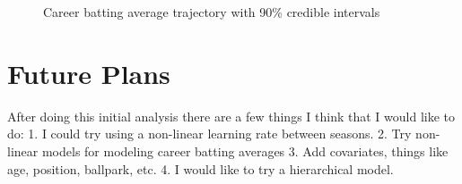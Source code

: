 \documentclass[
  letterpaper,
  DIV=11,
  numbers=noendperiod]{scrartcl}
\begin{document}
\begin{figure}[H]


\caption{\label{fig-career-trajectory}Career batting average trajectory
with 90\% credible intervals}

\end{figure}%

\section{Future Plans}\label{future-plans}

After doing this initial analysis there are a few things I think that I
would like to do: 1. I could try using a non-linear learning rate
between seasons. 2. Try non-linear models for modeling career batting
averages 3. Add covariates, things like age, position, ballpark, etc. 4.
I would like to try a hierarchical model.
\end{document}
